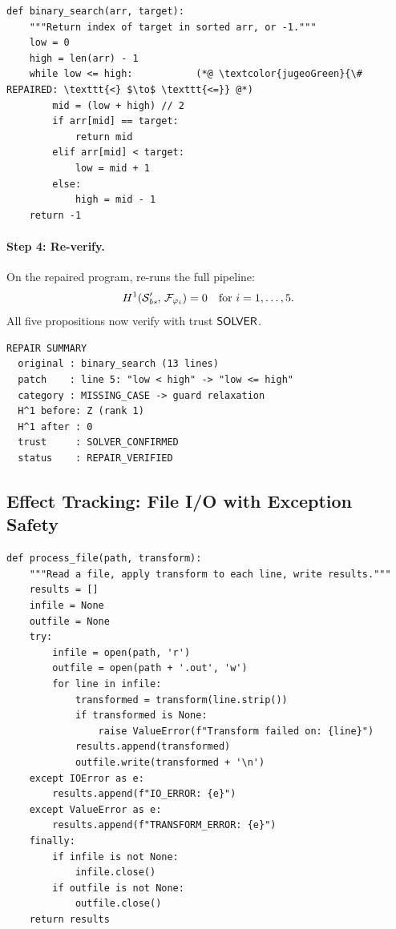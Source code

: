 \begin{lstlisting}[style=jugeo-python,caption={Repaired binary search.},label={lst:binsearch-fix}]
def binary_search(arr, target):
    """Return index of target in sorted arr, or -1."""
    low = 0
    high = len(arr) - 1
    while low <= high:           (*@ \textcolor{jugeoGreen}{\# REPAIRED: \texttt{<} $\to$ \texttt{<=}} @*)
        mid = (low + high) // 2
        if arr[mid] == target:
            return mid
        elif arr[mid] < target:
            low = mid + 1
        else:
            high = mid - 1
    return -1
\end{lstlisting}

\paragraph{Step 4: Re-verify.}
On the repaired program, \JuGeo{} re-runs the full pipeline:
\[
  H^{1}(\mathcal{S}_{\mathit{bs}}^{\prime},\,
            \mathcal{F}_{\varphi_i}) = 0
  \quad \text{for } i = 1,\ldots,5.
\]
All five propositions now verify with trust $\mathsf{SOLVER}$.

\begin{lstlisting}[style=jugeo-output,caption={Re-verification trace after repair.},label={lst:repair-trace}]
REPAIR SUMMARY
  original : binary_search (13 lines)
  patch    : line 5: "low < high" -> "low <= high"
  category : MISSING_CASE -> guard relaxation
  H^1 before: Z (rank 1)
  H^1 after : 0
  trust     : SOLVER_CONFIRMED
  status    : REPAIR_VERIFIED
\end{lstlisting}


\subsection{Effect Tracking: File I/O with Exception Safety}%
\label{sec:app-effects}

\begin{lstlisting}[style=jugeo-python,caption={File processor with exception safety.},label={lst:fileio}]
def process_file(path, transform):
    """Read a file, apply transform to each line, write results."""
    results = []
    infile = None
    outfile = None
    try:
        infile = open(path, 'r')
        outfile = open(path + '.out', 'w')
        for line in infile:
            transformed = transform(line.strip())
            if transformed is None:
                raise ValueError(f"Transform failed on: {line}")
            results.append(transformed)
            outfile.write(transformed + '\n')
    except IOError as e:
        results.append(f"IO_ERROR: {e}")
    except ValueError as e:
        results.append(f"TRANSFORM_ERROR: {e}")
    finally:
        if infile is not None:
            infile.close()
        if outfile is not None:
            outfile.close()
    return results
\end{lstlisting}

